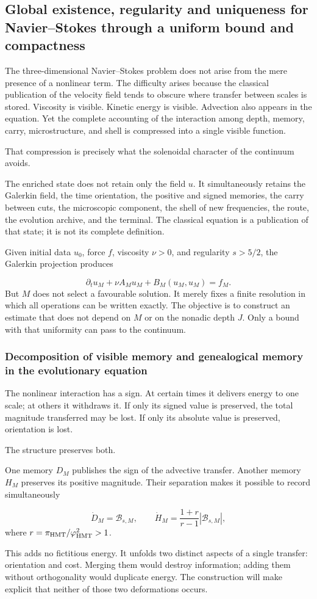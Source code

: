 \subsection{Global existence, regularity and uniqueness for Navier–Stokes through a uniform bound and compactness}
The three-dimensional Navier–Stokes problem does not arise from the mere presence of a nonlinear term. The difficulty arises because the classical publication of the velocity field tends to obscure where transfer between scales is stored. Viscosity is visible. Kinetic energy is visible. Advection also appears in the equation. Yet the complete accounting of the interaction among depth, memory, carry, microstructure, and shell is compressed into a single visible function.\par
That compression is precisely what the solenoidal character of the continuum avoids.\par
The enriched state does not retain only the field \(u\). It simultaneously retains the Galerkin field, the time orientation, the positive and signed memories, the carry between cuts, the microscopic component, the shell of new frequencies, the route, the evolution archive, and the terminal. The classical equation is a publication of that state; it is not its complete definition.\par
Given initial data \(u_0\), force \(f\), viscosity \(\nu>0\), and regularity \(s>5/2\), the Galerkin projection produces\par
\[
\partial_tu_M+\nu A_Mu_M+B_M(u_M,u_M)=f_M.
\]
But \(M\) does not select a favourable solution. It merely fixes a finite resolution in which all operations can be written exactly. The objective is to construct an estimate that does not depend on \(M\) or on the nonadic depth \(J\). Only a bound with that uniformity can pass to the continuum.\par
{}
\subsubsection{Decomposition of visible memory and genealogical memory in the evolutionary equation}
The nonlinear interaction has a sign. At certain times it delivers energy to one scale; at others it withdraws it. If only its signed value is preserved, the total magnitude transferred may be lost. If only its absolute value is preserved, orientation is lost.\par
The structure preserves both.\par
One memory \(D_M\) publishes the sign of the advective transfer. Another memory \(H_M\) preserves its positive magnitude. Their separation makes it possible to record simultaneously\par
\[
\dot D_M=\mathscr B_{s,M},
\qquad
\dot H_M=\frac{1+r}{r-1}|\mathscr B_{s,M}|,
\]
where \(r=\pi_{\rm HMT}/\varphi_{\rm HMT}^2>1\).\par
This adds no fictitious energy. It unfolds two distinct aspects of a single transfer: orientation and cost. Merging them would destroy information; adding them without orthogonality would duplicate energy. The construction will make explicit that neither of those two deformations occurs.\par
{}
